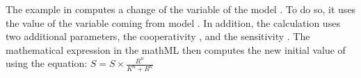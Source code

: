The example in  computes a change of the variable  of the model . To do so, it uses the value of the variable  coming from model . In addition, the calculation uses two additional parameters, the cooperativity , and the sensitivity . The mathematical expression in the mathML then computes the new initial value of  using the equation:
\begin{math}
S =  S \times \frac{R^{n}}{K^{n}+R^{n}}
\end{math}
